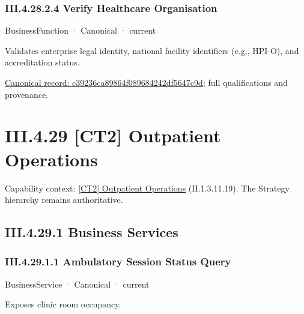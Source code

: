 \subsubsection*{III.4.28.2.4 Verify Healthcare Organisation}
\label{navigation:III.4.28.2.4}

\label{element:c39236ca89864f089684242df5647c9d}
{\small BusinessFunction · Canonical · current}\par

Validates enterprise legal identity, national facility identifiers (e.g., HPI-O), and accreditation status.


{\footnotesize \href{../../../../continuum/business/business-function/c39236ca89864f089684242df5647c9d.md}{Canonical record: c39236ca89864f089684242df5647c9d}; full qualifications and provenance.}\par
\section*{III.4.29 [CT2] Outpatient Operations}
\label{navigation:III.4.29}

{\small Capability context: \hyperref[element:21399d52b9624ddfbeb786f1d72e40c3]{[CT2] Outpatient Operations} (II.1.3.11.19). The Strategy hierarchy remains authoritative.}\par
\subsection*{III.4.29.1 Business Services}
\label{navigation:III.4.29.1}

\subsubsection*{III.4.29.1.1 Ambulatory Session Status Query}
\label{navigation:III.4.29.1.1}

\label{element:a790a785f2e148d7a1c99655d53db4e9}
{\small BusinessService · Canonical · current}\par

Exposes clinic room occupancy.



